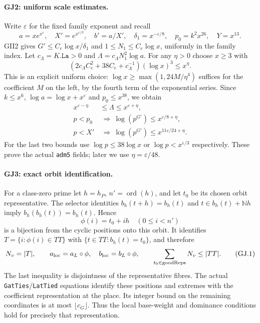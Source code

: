 \paragraph{GJ2: uniform scale estimates.}
Write $\varepsilon$ for the fixed family exponent and recall
\[
 a=x e^{x^\varepsilon},\quad X'=e^{x^{\varepsilon/3}},\quad
 b'=a/X',\quad \delta_1=x^{-\varepsilon/8},\quad
 p_0=k^2x^{26},\quad Y=x^{13}.
\]
GII2 gives $G'\le C_e\log x/\delta_1$ and
$1\le N_1\le C_e\log x$, uniformly in the family index.
Let $c_\Lambda=K.\texttt{La}>0$ and
$\Lambda=c_\Lambda N_1^2\log a$. For any $\eta>0$ choose $x\ge3$ with
\[
 \left(2c_\Lambda C_e^2+38C_e+c_\Lambda^{-1}\right)(\log x)^3
 \le x^\eta.
\]
This is an explicit uniform choice: $\log x\ge
\max(1,24M/\eta^4)$ suffices for the coefficient $M$ on the left,
by the fourth term of the exponential series. Since $k\le x^6$,
$\log a=\log x+x^\varepsilon$ and $p_0\le x^{38}$, we obtain
\begin{align*}
 x^{\varepsilon-\eta}&\le\Lambda\le x^{\varepsilon+\eta},\\
 p<p_0&\ \Longrightarrow\ \log(p^{G'})\le x^{\varepsilon/8+\eta},\\
 p<X'&\ \Longrightarrow\ \log(p^{G'})\le x^{11\varepsilon/24+\eta}.
\end{align*}
For the last two bounds use $\log p\le38\log x$ or
$\log p<x^{\varepsilon/3}$ respectively. These prove the actual
\texttt{adm5} fields; later we use $\eta=\varepsilon/48$.

\paragraph{GJ3: exact orbit identification.}
For a class-zero prime let $h=h_P$, $n'=\operatorname{ord}(h)$,
and let $t_0$ be its chosen orbit representative. The selector identities
$b_h(t+h)=b_h(t)$ and $t\in b_h(t)+\mathbb Nh$ imply
$b_h(b_h(t))=b_h(t)$. Hence
\[
 \phi(i)=t_0+ih\quad(0\le i<n')
\]
is a bijection from the cyclic positions onto this orbit. It identifies
$T=\{i:\phi(i)\in TT\}$ with $\{t\in TT:b_h(t)=t_0\}$, and therefore
\[
 N_v=|T|,\qquad a_{\rm loc}=a_L\circ\phi,\quad
 b_{\rm loc}=b_L\circ\phi,\qquad
 \sum_{t_0\in\mathrm{goodReps}}N_v\le|TT|. \tag{GJ.1}
\]
The last inequality is disjointness of the representative fibres.
The actual \texttt{GatTies}/\texttt{LatTied} equations identify these
positions and extremes with the coefficient representation at the place.
Its integer bound on the remaining coordinates is at most
$\lfloor c_G\rfloor$. Thus the local base-weight and dominance conditions
hold for precisely that representation.

